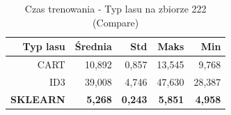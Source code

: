 \begin{table}[htbp]
\centering
\small
\setlength{\tabcolsep}{6pt}
\renewcommand{\arraystretch}{1.2}
\caption{Czas trenowania - Typ lasu na zbiorze 222 (Compare)}
\label{tab:Compare_on_222_time}
\begin{tabular}{r|r|r|r|r}
\toprule
Typ lasu & Średnia & Std & Maks & Min \\
\hline
CART & 10,892 & 0,857 & 13,545 & 9,768 \\
ID3 & 39,008 & 4,746 & 47,630 & 28,387 \\
\textbf{SKLEARN} & \textbf{5,268} & \textbf{0,243} & \textbf{5,851} & \textbf{4,958} \\
\bottomrule
\end{tabular}
\end{table}
